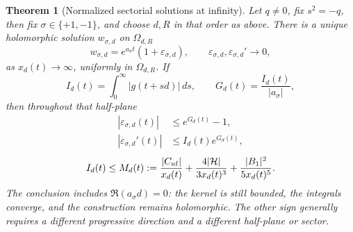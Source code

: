 \documentclass[11pt]{article}
\newtheorem{theorem}{Theorem}[section]
\theoremstyle{remark}
\begin{document}
\begin{theorem}[Normalized sectorial solutions at infinity]
\label{thm:olver-sectorial}
Let \(q\ne0\), fix \(s^2=-q\), then fix
\(\sigma\in\{+1,-1\}\), and choose \(d,R\) in that order as above.  There
is a unique holomorphic solution \(w_{\sigma,d}\) on \(\Omega_{d,R}\)
\begin{equation}
 w_{\sigma,d}=e^{a_\sigma t}(1+\varepsilon_{\sigma,d}),\qquad
 \varepsilon_{\sigma,d},\varepsilon_{\sigma,d}'\longrightarrow0,
\end{equation}
as \(x_d(t)\to\infty\), uniformly in \(\Omega_{d,R}\).  If
\begin{equation}
 I_d(t)=\int_0^\infty|g(t+sd)|\,ds,\qquad
 G_d(t)=\frac{I_d(t)}{|a_\sigma|},
\end{equation}
then throughout that half-plane
\begin{align}
 |\varepsilon_{\sigma,d}(t)|&\leq e^{G_d(t)}-1,
 \label{eq:olver-epsilon-bound}\\
 |\varepsilon_{\sigma,d}'(t)|&\leq I_d(t)e^{G_d(t)},
 \label{eq:olver-derivative-bound}
\end{align}
\begin{equation}
 I_d(t)\leq M_d(t):=
 \frac{|C_{\rm nf}|}{x_d(t)}+\frac{4|\mathcal{H}|}{3x_d(t)^3}
 +\frac{|B_1|^2}{5x_d(t)^5}.
 \label{eq:olver-radial-majorant}
\end{equation}
The conclusion includes \(\Re(a_\sigma d)=0\): the kernel is still bounded,
the integrals converge, and the construction remains holomorphic.
The other sign generally requires a different progressive direction and a
different half-plane or sector.
\end{theorem}
\end{document}
